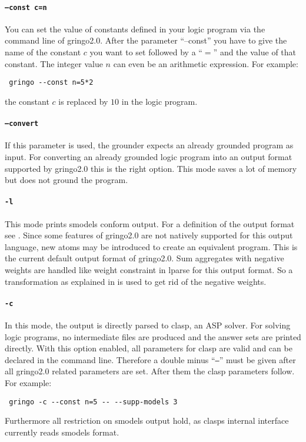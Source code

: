\documentclass[a4paper,10pt]{article}
\begin{document}
\paragraph{\texttt{--const c=n}}
You can set the value of constants defined in your logic program via the command line of gringo2.0.
After the parameter ``--const'' you have to give the name of the constant $c$ you want to set followed by a ``$=$'' and the value of that constant. The integer value $n$ can even be an arithmetic expression. For example:
\begin{verbatim}
 gringo --const n=5*2
\end{verbatim}
the constant $c$ is replaced by $10$ in the logic program.

\paragraph{\texttt{--convert}}
If this parameter is used, the grounder expects an already grounded program as input.
For converting an already grounded logic program into an output format supported by gringo2.0 this is the right option. This mode saves a lot of memory but does not ground the program.
\paragraph{\texttt{-l}}
This mode prints smodels conform output. For a definition of the output format see \cite{lparseManual}.
Since some features of gringo2.0 are not natively supported for this output language, new atoms may be introduced to create an equivalent program.\newline
This is the current default output format of gringo2.0.
Sum aggregates with negative weights are handled like weight constraint in lparse for this output format. So a transformation as explained in \cite{lparseManual} is used to get rid of the negative weights.
\paragraph{\texttt{-c}}
In this mode, the output is directly parsed to clasp, an ASP solver. For solving logic programs, no intermediate files are produced and the answer sets are printed directly.
With this option enabled, all parameters for clasp are valid and can be declared in the command line. Therefore a double minus ``\texttt{--}'' must be given after all gringo2.0 related parameters are set. After them the clasp parameters follow.
For example:
\begin{verbatim}
 gringo -c --const n=5 -- --supp-models 3
\end{verbatim}
Furthermore all restriction on smodels output hold, as clasps internal interface currently reads smodels format.
\end{document}
